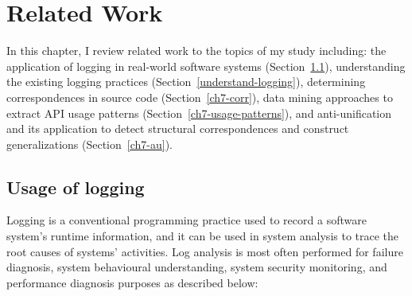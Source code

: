 \chapter{Related Work}  \label{rw}
In this chapter, I review related work to the topics of my study including: the application of logging in real-world software systems (Section~\ref{logging}), understanding the existing logging practices (Section~\ref{understand-logging}),
 determining correspondences in source code (Section~\ref{ch7-corr}), data mining approaches to extract API usage patterns (Section~\ref{ch7-usage-patterns}), and anti-unification and its application to detect structural correspondences and construct generalizations (Section~\ref{ch7-au}). %
\section{Usage of logging}  \label{logging}
Logging is a conventional programming practice used to record a software system's runtime information, and it can be used in system analysis to trace the root causes of systems' activities. Log analysis is most often performed for failure diagnosis, system behavioural understanding, system security monitoring, and performance diagnosis purposes as described below:
